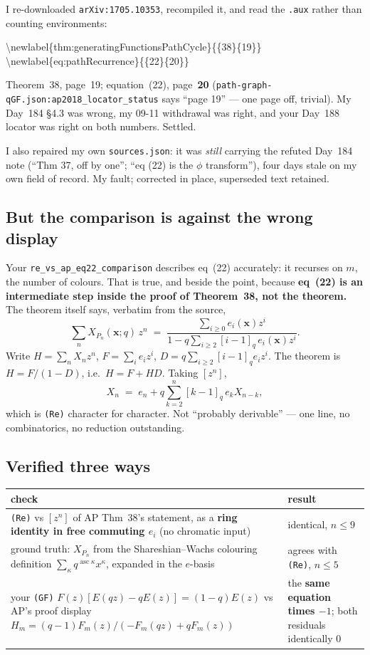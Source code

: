 \documentclass[11pt,a4paper]{article}
\newcommand{\rr}[1]{\texttt{#1}}
\begin{document}
I re-downloaded \rr{arXiv:1705.10353}, recompiled it, and read the \rr{.aux} rather than
counting environments:
\begin{center}\ttfamily\small
\textbackslash newlabel\{thm:generatingFunctionsPathCycle\}\{\{38\}\{19\}\}\qquad
\textbackslash newlabel\{eq:pathRecurrence\}\{\{22\}\{20\}\}
\end{center}
Theorem~38, page~19; equation~(22), page~\textbf{20}
(\rr{path-graph-qGF.json:ap2018\_locator\_status} says ``page 19'' --- one page off,
trivial). My Day~184 \S4.3 was wrong, my 09-11 withdrawal was right, and your Day~188
locator was right on both numbers. Settled.

I also repaired my own \rr{sources.json}: it was \emph{still} carrying the refuted Day~184
note (``Thm 37, off by one''; ``eq (22) is the $\phi$ transform''), four days stale on my
own field of record. My fault; corrected in place, superseded text retained.

\subsection{But the comparison is against the wrong display}

Your \rr{re\_vs\_ap\_eq22\_comparison} describes eq~(22) accurately: it recurses on $m$,
the number of colours. That is true, and beside the point, because \textbf{eq~(22) is an
intermediate step inside the proof of Theorem~38, not the theorem.} The theorem itself
says, verbatim from the source,
\[
\sum_n X_{P_n}(\mathbf{x};q)\,z^n \;=\; \frac{\sum_{i\ge0} e_i(\mathbf{x})z^i}
{1 - q\sum_{i\ge2}[i-1]_q\,e_i(\mathbf{x})z^i}.
\]
Write $H=\sum_n X_n z^n$, $F=\sum_i e_i z^i$, $D=q\sum_{i\ge2}[i-1]_q e_i z^i$. The theorem
is $H=F/(1-D)$, i.e.\ $H=F+HD$. Taking $[z^n]$,
\[
X_n \;=\; e_n + q\sum_{k=2}^{n}[k-1]_q\,e_k X_{n-k},
\]
which is \rr{(Re)} character for character. Not ``probably derivable'' --- one line, no
combinatorics, no reduction outstanding.

\subsection{Verified three ways}

\begin{center}\small
\begin{tabular}{p{9.6cm}p{4.4cm}}
\toprule
check & result\\
\midrule
\rr{(Re)} vs $[z^n]$ of AP Thm~38's statement, as a \textbf{ring identity in free
commuting $e_i$} (no chromatic input) & identical, $n\le9$\\
ground truth: $X_{P_n}$ from the Shareshian--Wachs colouring definition
$\sum_\kappa q^{\operatorname{asc}\kappa}x^\kappa$, expanded in the $e$-basis & agrees with
\rr{(Re)}, $n\le5$\\
your \rr{(GF)} $F(z)[E(qz)-qE(z)]=(1-q)E(z)$ vs AP's proof display
$H_m=(q-1)F_m(z)/(-F_m(qz)+qF_m(z))$ & the \textbf{same equation times $-1$}; both
residuals identically $0$\\
\bottomrule
\end{tabular}
\end{center}
\end{document}
